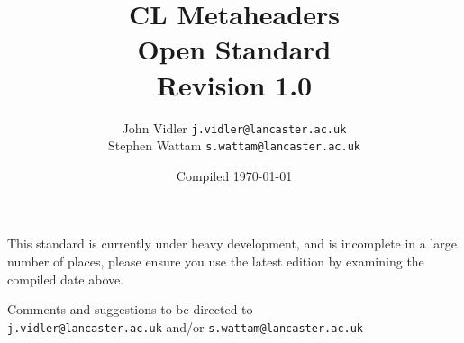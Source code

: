 \documentclass[12pt,a4paper]{article}
\title{CL Metaheaders \\ Open Standard \\ Revision 1.0}
\author{
        John Vidler \texttt{j.vidler@lancaster.ac.uk} \\
        Stephen Wattam \texttt{s.wattam@lancaster.ac.uk} \\
}
\date{Compiled \today}
\begin{document}
\maketitle

\begin{center}
\vspace*{3em}
This standard is currently under heavy development, and is incomplete in a large number of places, please ensure you use the latest edition by examining the compiled date above.

\vspace*{3em}

Comments and suggestions to be directed to\\
\texttt{j.vidler@lancaster.ac.uk} and/or \texttt{s.wattam@lancaster.ac.uk}
\end{center}
\clearpage

\tableofcontents\clearpage

\clearpage
\clearpage
\clearpage



\end{document}
